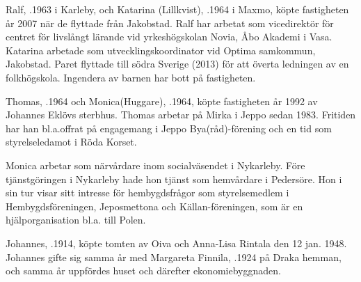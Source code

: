 Ralf, .1963 i Karleby, och Katarina (Lillkvist), .1964 i Maxmo, köpte fastigheten år 2007 när de flyttade från Jakobstad. Ralf har arbetat som vicedirektör för centret för livslångt lärande vid yrkeshögskolan Novia, Åbo Akademi i Vasa. Katarina arbetade som utvecklingskoordinator vid Optima samkommun, Jakobstad. Paret flyttade till södra Sverige (2013) för att överta ledningen av en folkhögskola. Ingendera av barnen har bott på fastigheten.
\begin{jhchildren}
  \item {}
  \item {}
  \item {}
  \item {}
  \item {}
\end{jhchildren}


Thomas, .1964 och Monica(Huggare), .1964, köpte fastigheten år 1992 av Johannes Eklövs sterbhus. Thomas arbetar på Mirka i Jeppo sedan 1983. Fritiden har han bl.a.offrat på engagemang i Jeppo Bya(råd)-förening och en tid som styrelseledamot i Röda Korset.

Monica arbetar som närvårdare inom socialväsendet i Nykarleby. Före tjänstgöringen i Nykarleby hade hon tjänst som hemvårdare i Pedersöre. Hon i sin tur visar sitt intresse för hembygdsfrågor som styrelsemedlem i Hembygdsföreningen, Jeposmettona och Källan-föreningen, som är en hjälporganisation bl.a. till Polen.
\begin{jhchildren}
  \item {}
  \item {}
  \item {}
\end{jhchildren}


Johannes, .1914, köpte tomten av Oiva och Anna-Lisa Rintala den 12 jan. 1948. Johannes gifte sig samma år med Margareta Finnila, .1924 på Draka hemman, och samma år uppfördes huset och därefter ekonomiebyggnaden.

